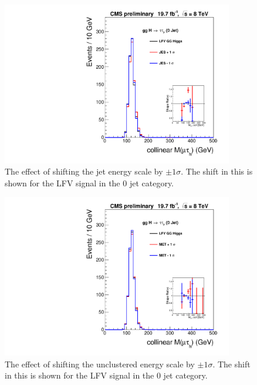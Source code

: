\documentclass[oneside, letterpaper, oldfontcommands]{memoir}
\begin{document}
\begin{figure}[hbtp]\centering
\includegraphics[width=0.9\textwidth]{JES_Shift_8TeV.pdf}

\caption{The effect of shifting the jet energy scale by $\pm 1 \sigma$. The shift in this is shown for the LFV signal in the 0 jet category.} 
\label{fig:jesshift}\end{figure}

\begin{figure}[hbtp]\centering
\includegraphics[width=0.9\textwidth]{UES_Shift_8TeV.pdf}

\caption{The effect of shifting the unclustered energy scale by $\pm 1 \sigma$. The shift in this is shown for the LFV signal in the 0 jet category.} 
\label{fig:uesshift}\end{figure}
\end{document}
